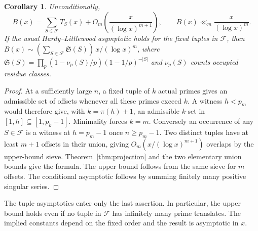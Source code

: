 \documentclass[11pt,a4paper]{article}
\newtheorem{corollary}[theorem]{Corollary}
\begin{document}
\begin{corollary}\label{cor:patterns}
Unconditionally,
\[
 B(x)=\sum_{S\in\mathcal F}T_S(x)
       +O_m\!\left(\frac{x}{(\log x)^{m+1}}\right),
 \qquad B(x)\ll_m\frac{x}{(\log x)^m}.
\]
If the usual Hardy--Littlewood asymptotic holds for the fixed tuples in
$\mathcal F$, then $B(x)\sim
(\sum_{S\in\mathcal F}\mathfrak S(S))\,x/(\log x)^m$,
where $\mathfrak S(S)=\prod_p(1-\nu_p(S)/p)(1-1/p)^{-|S|}$
and $\nu_p(S)$ counts occupied residue classes.
\end{corollary}
\begin{proof}
At a sufficiently large $n$, a fixed tuple of $k$ actual primes gives
an admissible set of offsets whenever all these primes exceed $k$.
A witness $h<p_m$ would therefore give, with $k=\pi(h)+1$, an
admissible $k$-set in $[1,h]\subseteq[1,p_k-1]$. Minimality forces
$k=m$. Conversely an occurrence of any $S\in\mathcal F$ is a witness
at $h=p_m-1$ once $n\ge p_m-1$. Two distinct tuples have at least
$m+1$ offsets in their union, giving $O_m(x/(\log x)^{m+1})$
overlaps by the upper-bound sieve. Theorem~\ref{thm:projection} and the
two elementary union bounds give the formula. The upper bound follows
from the same sieve for $m$ offsets. The conditional asymptotic follows
by summing finitely many positive singular series.
\end{proof}
The tuple asymptotics enter only the last assertion. In particular,
the upper bound holds even if no tuple in $\mathcal F$ has infinitely
many prime translates. The implied constants depend on the fixed
order and the result is asymptotic in $x$.
\end{document}
